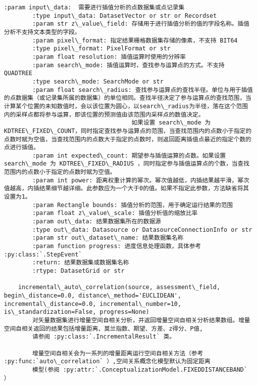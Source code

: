 \documentclass[11pt]{article}
\begin{document}
\begin{Verbatim}[commandchars=\\\{\}]
        :param input\_data:  需要进行插值分析的点数据集或点记录集
        :type input\_data: DatasetVector or str or Recordset
        :param str z\_value\_field: 存储用于进行插值分析的值的字段名称。插值分析不支持文本类型的字段。
        :param pixel\_format: 指定结果栅格数据集存储的像素，不支持 BIT64
        :type pixel\_format: PixelFormat or str
        :param float resolution: 插值运算时使用的分辨率
        :param search\_mode: 插值运算时，查找参与运算点的方式。不支持 QUADTREE
        :type search\_mode: SearchMode or str
        :param float search\_radius: 查找参与运算点的查找半径。单位与用于插值的点数据集（或记录集所属的数据集）的单位相同。查找半径决定了参与运算点的查找范围，当计算某个位置的未知数值时，会以该位置为圆心，以search\_radius为半径，落在这个范围内的采样点都将参与运算，即该位置的预测值由该范围内采样点的数值决定。
                                    如果设置 search\_mode 为KDTREE\_FIXED\_COUNT，同时指定查找参与运算点的范围，当查找范围内的点数小于指定的点数时赋为空值，当查找范围内的点数大于指定的点数时，则返回距离插值点最近的指定个数的点进行插值。
        :param int expected\_count: 期望参与插值运算的点数。如果设置 search\_mode 为 KDTREE\_FIXED\_RADIUS ，同时指定参与插值运算点的个数，当查找范围内的点数小于指定的点数时赋为空值。
        :param int power: 距离权重计算的幂次。幂次值越低，内插结果越平滑，幂次值越高，内插结果细节越详细。此参数应为一个大于0的值。如果不指定此参数，方法缺省将其设置为1。
        :param Rectangle bounds: 插值分析的范围，用于确定运行结果的范围
        :param float z\_value\_scale: 插值分析值的缩放比率
        :param out\_data: 结果数据集所在的数据源
        :type out\_data: Datasource or DatasourceConnectionInfo or str
        :param str out\_dataset\_name: 结果数据集名称
        :param function progress: 进度信息处理函数，具体参考 :py:class:`.StepEvent`
        :return: 结果数据集或数据集名称
        :rtype: DatasetGrid or str
    
    incremental\_auto\_correlation(source, assessment\_field, begin\_distance=0.0, distance\_method='EUCLIDEAN', incremental\_distance=0.0, incremental\_number=10, is\_standardization=False, progress=None)
        对矢量数据集进行增量空间自相关分析，并返回增量空间自相关分析结果数组。增量空间自相关返回的结果包括增量距离、莫兰指数、期望、方差、z得分、P值,
        请参阅 :py:class:`.IncrementalResult` 类。
        
        增量空间自相关会为一系列的增量距离运行空间自相关方法（参考 :py:func:`auto\_correlation` ）,空间关系概念化模型默认为固定距离
        模型(参阅 :py:attr:`.ConceptualizationModel.FIXEDDISTANCEBAND` ）
        

\end{Verbatim}
\end{document}
